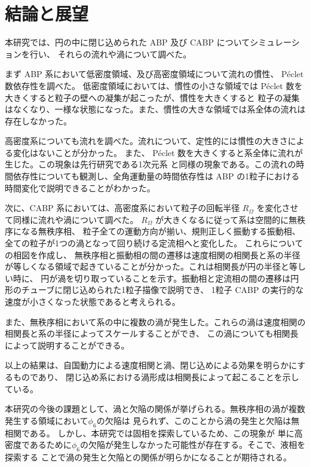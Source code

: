 \documentclass[/Users/ikedahajime/GitHub/reserch/master_report/thesis]{subfiles}
\begin{document}
\chapter{結論と展望}
本研究では、円の中に閉じ込められた ABP 及び CABP についてシミュレーションを行い、
それらの流れや渦について調べた。

まず ABP 系において低密度領域、及び高密度領域について流れの慣性、 Péclet 数依存性を調べた。
低密度領域においては、慣性の小さな領域では Péclet 数を大きくすると粒子の壁への凝集が起こったが、慣性を大きくすると
粒子の凝集はなくなり、一様な状態になった。また、慣性の大きな領域では系全体の流れは存在しなかった。

高密度系についても流れを調べた。流れについて、定性的には慣性の大きさによる変化はないことが分かった。
また、 Péclet 数を大きくすると系全体に流れが生じた。この現象は先行研究である1次元系\cite{capriniCollectiveEffectsConfined2021}
と同様の現象である。この流れの時間依存性についても観測し、全角運動量の時間依存性は ABP の1粒子における
時間変化で説明できることがわかった。


次に、CABP 系においては、高密度系において粒子の回転半径 $R_\Omega$ を変化させて同様に流れや渦について調べた。
$R_\Omega$ が大きくなるに従って系は空間的に無秩序になる無秩序相、
粒子全ての運動方向が揃い、規則正しく振動する振動相、全ての粒子が1つの渦となって回り続ける定流相へと変化した。
これらについての相図を作成し、
無秩序相と振動相の間の遷移は速度相関の相関長と系の半径が等しくなる領域で起きていることが分かった。これは相関長が円の半径と等しい時に、
円が渦を切り取っていることを示す。振動相と定流相の間の遷移は円形のチューブに閉じ込められた1粒子描像で説明でき、
1粒子 CABP の実行的な速度が小さくなった状態であると考えられる。

また、無秩序相において系の中に複数の渦が発生した。これらの渦は速度相関の相関長と系の半径によってスケールすることができ、
この渦についても相関長によって説明することができる。

以上の結果は、自国動力による速度相関と渦、閉じ込めによる効果を明らかにするものであり、
閉じ込め系における渦形成は相関長によって起こることを示している。

本研究の今後の課題として、渦と欠陥の関係が挙げられる。無秩序相の渦が複数発生する領域において$\phi_6$の欠陥は
見られず、このことから渦の発生と欠陥は無相関である。
しかし、本研究では固相\cite{kurodaLongrangeTranslationalOrder2024}を探索しているため、この現象が
単に高密度であるために$\phi_6$の欠陥が発生しなかった可能性が存在する。そこで、液相を探索する
ことで渦の発生と欠陥との関係が明らかになることが期待される。
\end{document}
